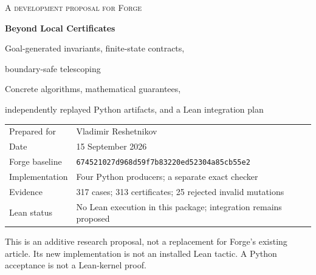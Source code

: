 \documentclass[11pt,letterpaper]{article}
\theoremstyle{definition}
\theoremstyle{remark}
\begin{document}
\begin{titlepage}
\vspace*{1.0in}
{\Large\scshape A development proposal for Forge\par}
\vspace{0.35in}
{\Huge\bfseries Beyond Local Certificates\par}
\vspace{0.3in}
{\LARGE Goal-generated invariants, finite-state contracts,\par boundary-safe telescoping\par}
\vspace{0.6in}
{\large Concrete algorithms, mathematical guarantees,\par independently replayed Python artifacts, and a Lean integration plan\par}
\vfill
\begin{tabularx}{\textwidth}{@{}lX@{}}
Prepared for & Vladimir Reshetnikov\\[5pt]
Date & 15 September 2026\\[5pt]
Forge baseline & \texttt{674521027d968d59f7b83220ed52304a85cb55e2}\\[5pt]
Implementation & Four Python producers; a separate exact checker\\[5pt]
Evidence & 317 cases; 313 certificates; 25 rejected invalid mutations\\[5pt]
Lean status & No Lean execution in this package; integration remains proposed
\end{tabularx}\par
\vspace{0.30in}
{\small This is an additive research proposal, not a replacement for Forge's existing article. Its new implementation is not an installed Lean tactic. A Python acceptance is not a Lean-kernel proof.\par}
\end{titlepage}
\end{document}
